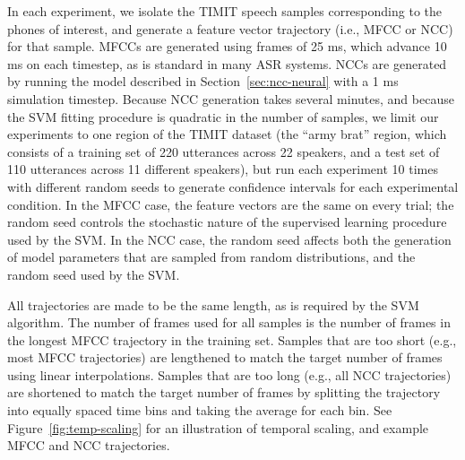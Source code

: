 In each experiment,
we isolate the TIMIT speech samples
corresponding to the phones
of interest,
and generate a feature vector trajectory
(i.e., MFCC or NCC)
for that sample.
MFCCs are generated using frames
of 25 ms,
which advance 10 ms on each timestep,
as is standard in many ASR systems.
NCCs are generated
by running the model described in
Section~\ref{sec:ncc-neural} with a 1 ms simulation timestep.
Because NCC generation takes several minutes,
and because the SVM fitting procedure
is quadratic in the number of samples,
we limit our experiments to
one region of the TIMIT dataset
(the ``army brat'' region,
which consists of a training set
of 220 utterances across 22 speakers,
and a test set of 110 utterances
across 11 different speakers),
but run each experiment
10 times with different random seeds
to generate confidence intervals
for each experimental condition.
In the MFCC case,
the feature vectors are the same
on every trial;
the random seed controls the
stochastic nature of
the supervised learning procedure
used by the SVM.
In the NCC case,
the random seed affects both
the generation of model parameters
that are sampled from random distributions,
and the random seed used by the SVM.

All trajectories are
made to be the same length,
as is required by the SVM algorithm.
The number of frames used
for all samples is
the number of frames in
the longest MFCC trajectory
in the training set.
Samples that are too short
(e.g., most MFCC trajectories)
are lengthened to match the
target number of frames
using linear interpolations.
Samples that are too long
(e.g., all NCC trajectories)
are shortened to match the
target number of frames
by splitting the trajectory
into equally spaced time bins
and taking the average
for each bin.
See Figure~\ref{fig:temp-scaling} for
an illustration of temporal scaling,
and example MFCC and NCC trajectories.


